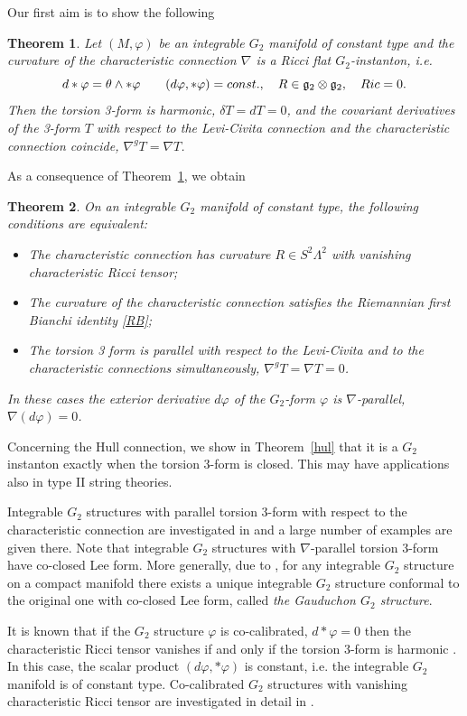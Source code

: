\documentclass[10pt,british]{article}
\newtheorem{thrm}{Theorem}[section]
\def\sb {{\nabla}}
\def\LC{{\nabla^g}}
\def\p{{\varphi}}
\begin{document}
Our first aim  is to show the following
\begin{thrm}\label{inst}
Let $(M,\p)$ be  an integrable $G_2$ manifold of constant type and the  curvature of the characteristic  connection $\sb$   is a Ricci flat  $G_2$-instanton, i.e.
\[d*\p=\theta\wedge*\p \qquad (d\p,*\p)=const.,\quad R\in \frak{g}_2\otimes\frak{g}_2, \quad Ric=0.\]
Then the torsion 3-form is harmonic, $\delta T=dT=0$, and the covariant derivatives of the 3-form $T$ with respect to the Levi-Civita connection and the characteristic connection coincide, $\LC T=\sb T$.
\end{thrm}
As a consequence of Theorem~\ref{inst}, we obtain
\begin{thrm}\label{mainsu3}
On an integrable $G_2$ manifold of constant type, the following conditions are equivalent:
\begin{itemize}
\item[a)] The characteristic connection  has curvature $R \in S^2\Lambda^2$ with vanishing characteristic Ricci tensor;
\item[b)] The curvature of the characteristic connection satisfies the Riemannian first Bianchi identity \eqref{RB};
\item[c)] The torsion 3 form  is  parallel  with respect to the Levi-Civita and to the characteristic connections simultaneously, $\LC T=\sb T=0$.
\end{itemize}
In these cases 
the exterior derivative $d\p$ of the $G_2$-form $\p$ is  $\sb$-parallel, $\sb(d\p)=0$.
\end{thrm} 
Concerning the Hull connection, we show in Theorem~\ref{hul} that it is a $G_2$ instanton  exactly when the  torsion 3-form is closed. This may have  applications  also   in type II string theories.

Integrable $G_2$ structures  with parallel torsion 3-form with respect to the characteristic connection are investigated in  \cite{F,AFer,CMS}   and a large number of examples are given there. 
Note that integrable $G_2$ structures  with $\sb$-parallel torsion 3-form  have co-closed Lee form. More generally,   due to  \cite[Theorem~3.1]{FI1},  for any  integrable $G_2$ structure  on a compact manifold there exists a unique integrable $G_2$ structure conformal to the original one with co-closed Lee form,  called \emph{the Gauduchon $G_2$ structure}. 


 
It is known that if the $G_2$ structure $\p$ is co-calibrated, $d*\p=0$ then the characteristic Ricci tensor %
vanishes if and only if the torsion 3-form is harmonic  \cite[Theorem~5.4]{FI}. In this case, the scalar product $(d\p,*\p)$ is constant, i.e. the  integrable $G_2$ manifold is  of constant type.  Co-calibrated  $G_2$ structures  with vanishing characteristic Ricci tensor are investigated in detail in \cite{Fr}.
 
\end{document}
